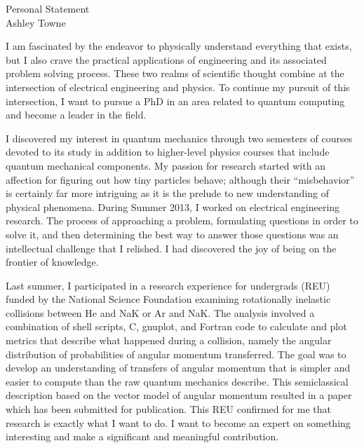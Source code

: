 \setlength{\oddsidemargin}{0in}
\setlength{\evensidemargin}{0in}
\setlength{\textwidth}{6.5in}
\setlength{\topmargin}{-.3in}
\setlength{\textheight}{9in}
\pagestyle{empty}



\begin{center}
{\Large Personal Statement} \\[.3in]
{\large Ashley Towne}
\end{center}

\vspace*{.5in}
{I am fascinated by the endeavor to physically understand everything that
    exists, but I also crave the practical applications of engineering and its
    associated problem solving process. These two realms of scientific thought
    combine at the intersection of electrical engineering and physics. To
    continue my pursuit of this intersection, I want to pursue a PhD in an area
    related to quantum computing and become a leader in the field. 

    I discovered my interest in quantum mechanics through two semesters of
    courses devoted to its study in addition to higher-level physics courses
    that include quantum mechanical components. My passion for research started
    with an affection for figuring out how tiny particles behave; although
    their “misbehavior” is certainly far more intriguing as it is the prelude
    to new understanding of physical phenomena. During Summer 2013, I worked on
    electrical engineering research. The process of approaching a problem,
    formulating questions in order to solve it, and then determining the best
    way to answer those questions was an intellectual challenge that I
    relished. I had discovered the joy of being on the frontier of knowledge.

    Last summer, I participated in a research experience for undergrads (REU)
    funded by the National Science Foundation examining rotationally inelastic
    collisions between He and NaK or Ar and NaK. The analysis involved a
    combination of shell scripts, C, gnuplot, and Fortran code to calculate and
    plot metrics that describe what happened during a collision, namely the
    angular distribution of probabilities of angular momentum transferred.  The
    goal was to develop an understanding of transfers of angular momentum that
    is simpler and easier to compute than the raw quantum mechanics describe.
    This semiclassical description based on the vector model of angular
    momentum resulted in a paper which has been submitted for publication.
    This REU confirmed for me that research is exactly what I want to do.  I
    want to become an expert on something interesting and make a significant
    and meaningful contribution.

}
